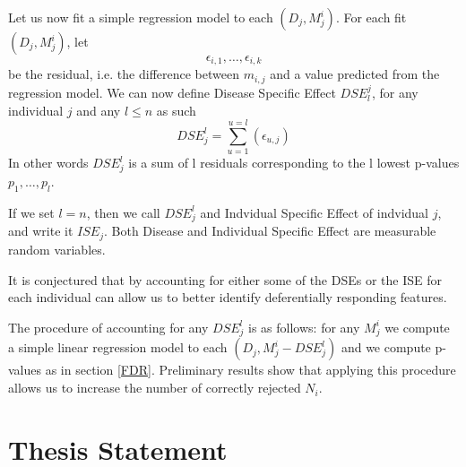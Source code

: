 Let us now fit a simple regression model to each $(D_{j}, M^{i}_{j})$. For each fit $(D_{j}, M^{i}_{j})$, let $$\epsilon_{i, 1}, \ldots, \epsilon_{i, k}$$ be the residual, i.e. the difference between $m_{i, j}$ and a value predicted from the regression model. We can now define Disease Specific Effect $DSE^{j}_{l}$, for any individual $j$ and any $l \leq n$ as such
$$DSE^{l}_{j}=\sum^{u=l}_{u=1}(\epsilon_{u,j})$$
In other words $DSE^{l}_{j}$ is a sum of l residuals corresponding to the l lowest p-values $p_{1}, \ldots, p_{l}$.

If we set $l = n$, then we call $DSE^{l}_{j}$ and Indvidual Specific Effect of indvidual $j$, and write it $ISE_{j}$. Both Disease and Individual Specific Effect are measurable random variables.

It is conjectured that by accounting for either some of the DSEs or the ISE for each individual can allow us to better identify deferentially responding features.

The procedure of accounting for any $DSE^{l}_{j}$ is as follows: for any $M^{i}_{j}$ we compute a simple linear regression model to each $(D_{j}, M^{i}_{j} - DSE^{l}_{j})$ and we compute p-values as in section \ref{FDR}. Preliminary results show that applying this procedure allows us to increase the number of correctly rejected $N_{i}$.
%
\section{Thesis Statement}
\label{c:intro:thesisstatement}


